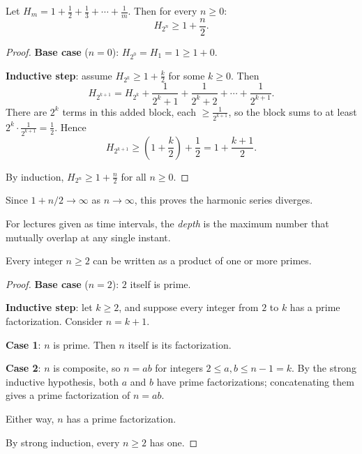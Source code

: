 \bigskip
\begin{example}
Let $H_m = 1+\tfrac12+\tfrac13+\cdots+\tfrac1m$. Then for every $n\ge0$:
\[
H_{2^n} \ge 1+\frac{n}{2}.
\]
\end{example}
\begin{proof}
\textbf{Base case} ($n=0$): $H_{2^0}=H_1=1 \ge 1+0$.

\textbf{Inductive step}: assume $H_{2^k}\ge1+\frac{k}{2}$ for some $k\ge0$. Then
\[
H_{2^{k+1}} = H_{2^k} + \frac{1}{2^k+1}+\frac{1}{2^k+2}+\cdots+\frac{1}{2^{k+1}}.
\]
There are $2^k$ terms in this added block, each $\ge \frac{1}{2^{k+1}}$, so the block sums to at least $2^k\cdot\frac{1}{2^{k+1}}=\frac12$. Hence
\[
H_{2^{k+1}} \ge \left(1+\frac{k}{2}\right)+\frac12 = 1+\frac{k+1}{2}.
\]

By induction, $H_{2^n}\ge1+\frac{n}{2}$ for all $n\ge0$.
\end{proof}

\begin{note}
Since $1+n/2 \to \infty$ as $n\to\infty$, this proves the harmonic series diverges.
\end{note}

\bigskip
\begin{definition}
For lectures given as time intervals, the \emph{depth} is the maximum number that mutually overlap at any single instant.
\end{definition}

\bigskip
\begin{example}
Every integer $n\ge2$ can be written as a product of one or more primes.
\end{example}
\begin{proof}
\textbf{Base case} ($n=2$): $2$ itself is prime.

\textbf{Inductive step}: let $k\ge2$, and suppose every integer from $2$ to $k$ has a prime factorization. Consider $n=k+1$.

\textbf{Case 1}: $n$ is prime. Then $n$ itself is its factorization.

\textbf{Case 2}: $n$ is composite, so $n=ab$ for integers $2\le a,b\le n-1=k$. By the strong inductive hypothesis, both $a$ and $b$ have prime factorizations; concatenating them gives a prime factorization of $n=ab$.

Either way, $n$ has a prime factorization.

By strong induction, every $n\ge2$ has one.
\end{proof}

